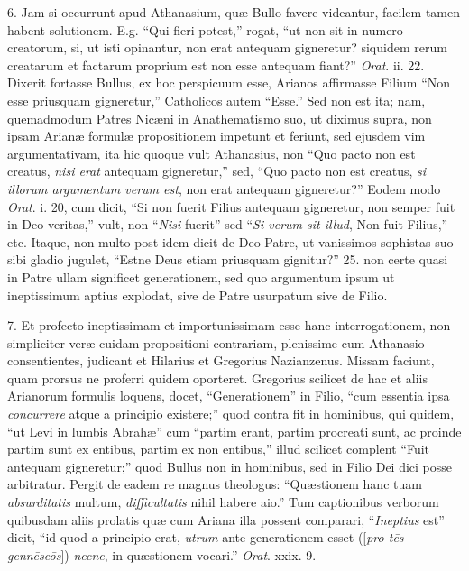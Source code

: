6. Jam si
occurrunt apud Athanasium, quæ Bullo favere videantur, facilem tamen
habent solutionem. E.g. ``Qui fieri potest,'' rogat, ``ut non sit
in numero creatorum, si, ut isti opinantur, non erat antequam
gigneretur? siquidem rerum creatarum et factarum proprium est non esse
antequam fiant?'' \emph{Orat}. ii. 22. Dixerit fortasse Bullus, ex
hoc perspicuum esse, Arianos affirmasse Filium ``Non esse priusquam
gigneretur,'' Catholicos autem ``Esse.'' Sed non est ita; nam,
quemadmodum Patres Nicæni in Anathematismo suo, ut diximus supra, non
ipsam Arianæ formulæ propositionem impetunt et feriunt, sed
ejusdem vim argumentativam, ita hic quoque vult Athanasius, non ``Quo
pacto non est creatus, \emph{nisi erat} antequam gigneretur,'' sed, ``Quo pacto non est creatus, \emph{si illorum argumentum verum est},
non erat antequam gigneretur?'' Eodem modo \emph{Orat}. i. 20, cum
dicit, ``Si non fuerit Filius antequam gigneretur, non semper fuit in
Deo veritas,'' vult, non ``\emph{Nisi} fuerit'' sed ``\emph{Si verum
sit illud}, Non fuit Filius,'' etc. Itaque, non multo post idem
dicit de Deo Patre, ut vanissimos sophistas suo sibi gladio jugulet, ``Estne Deus etiam priusquam
gignitur?'' 25. non certe quasi in
Patre ullam significet generationem, sed quo argumentum ipsum ut
ineptissimum aptius explodat, sive de Patre usurpatum sive de Filio.

7. Et
profecto ineptissimam et importunissimam esse hanc interrogationem,
non simpliciter veræ cuidam propositioni contrariam, plenissime cum
Athanasio consentientes, judicant et Hilarius et Gregorius Nazianzenus.
Missam faciunt, quam prorsus ne proferri quidem oporteret. Gregorius
scilicet de hac et aliis Arianorum formulis loquens, docet, ``Generationem'' in
Filio, ``cum essentia ipsa \emph{concurrere}
atque a principio existere;'' quod contra fit in hominibus, qui quidem,
``ut Levi in lumbis Abrahæ'' cum ``partim erant, partim
procreati sunt, ac proinde partim sunt ex entibus, partim ex non
entibus,'' illud scilicet complent ``Fuit antequam gigneretur;''
quod Bullus non in hominibus, sed in Filio Dei dici posse arbitratur.
Pergit de eadem re magnus theologus: ``Quæstionem hanc tuam \emph{absurditatis}
multum, \emph{difficultatis} nihil habere aio.'' Tum captionibus
verborum quibusdam aliis prolatis quæ cum Ariana illa possent
comparari, ``\emph{Ineptius} est'' dicit, ``id quod a principio
erat, \emph{utrum} ante generationem esset ([\emph{pro t\={e}s genn\={e}se\={o}s}])
\emph{necne}, in quæstionem vocari.'' \emph{Orat}. xxix. 9.


